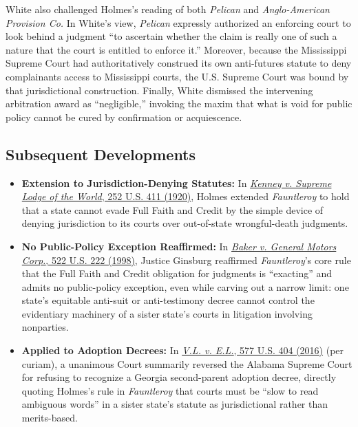\documentclass[12pt]{article}
\begin{document}
White also challenged Holmes's reading of both \textit{Pelican} and \textit{Anglo-American Provision Co.} In White's view, \textit{Pelican} expressly authorized an enforcing court to look behind a judgment ``to ascertain whether the claim is really one of such a nature that the court is entitled to enforce it.'' Moreover, because the Mississippi Supreme Court had authoritatively construed its own anti-futures statute to deny complainants access to Mississippi courts, the U.S. Supreme Court was bound by that jurisdictional construction. Finally, White dismissed the intervening arbitration award as ``negligible,'' invoking the maxim that what is void for public policy cannot be cured by confirmation or acquiescence.

\subsection{Subsequent Developments}

\begin{itemize}

\item \textbf{Extension to Jurisdiction-Denying Statutes:} In \href{https://supreme.justia.com/cases/federal/us/252/411/}{\textit{Kenney v. Supreme Lodge of the World}, 252 U.S. 411 (1920)}, Holmes extended \textit{Fauntleroy} to hold that a state cannot evade Full Faith and Credit by the simple device of denying jurisdiction to its courts over out-of-state wrongful-death judgments.

\item \textbf{No Public-Policy Exception Reaffirmed:} In \href{https://supreme.justia.com/cases/federal/us/522/222/}{\textit{Baker v. General Motors Corp.}, 522 U.S. 222 (1998)}, Justice Ginsburg reaffirmed \textit{Fauntleroy}'s core rule that the Full Faith and Credit obligation for judgments is ``exacting'' and admits no public-policy exception, even while carving out a narrow limit: one state's equitable anti-suit or anti-testimony decree cannot control the evidentiary machinery of a sister state's courts in litigation involving nonparties.

\item \textbf{Applied to Adoption Decrees:} In \href{https://www.law.cornell.edu/supremecourt/text/15-648}{\textit{V.L. v. E.L.}, 577 U.S. 404 (2016)} (per curiam), a unanimous Court summarily reversed the Alabama Supreme Court for refusing to recognize a Georgia second-parent adoption decree, directly quoting Holmes's rule in \textit{Fauntleroy} that courts must be ``slow to read ambiguous words'' in a sister state's statute as jurisdictional rather than merits-based.

\end{itemize}
\end{document}
